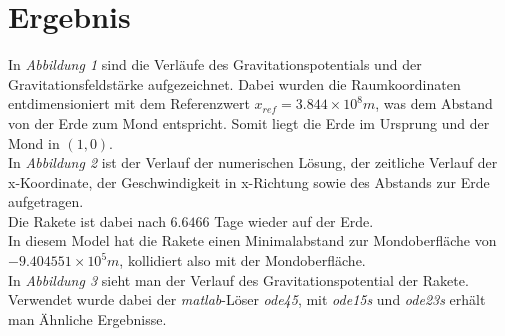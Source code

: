 \documentclass[11pt,a4paper]{article}
\begin{document}
  
  \section*{Ergebnis}
  
  In \textit{Abbildung 1} sind die Verl\"aufe des Gravitationspotentials und der Gravitationsfeldst\"arke aufgezeichnet. Dabei wurden die Raumkoordinaten entdimensioniert mit dem Referenzwert $x_{ref}=3.844\times10^8 m$, was dem Abstand von der Erde zum Mond entspricht. Somit liegt die Erde im Ursprung und der Mond in $(1,0)$.\\
  
  In \textit{Abbildung 2} ist der Verlauf der numerischen L\"osung, der zeitliche Verlauf der x-Koordinate, der Geschwindigkeit in x-Richtung sowie des Abstands zur Erde aufgetragen.\\
  
  Die Rakete ist dabei nach $6.6466$ Tage wieder auf der Erde.\\
  
    In diesem Model hat die Rakete einen Minimalabstand zur Mondoberfl\"ache von\\ $-9.404551\times10^5 m$, kollidiert also mit der Mondoberfl\"ache.\\
  
  In \textit{Abbildung 3} sieht man der Verlauf des Gravitationspotential der Rakete.\\
  
  Verwendet wurde dabei der \textit{matlab}-L\"oser \textit{ode45}, mit \textit{ode15s} und \textit{ode23s} erh\"alt man \"Ahnliche Ergebnisse.
  
\end{document}
